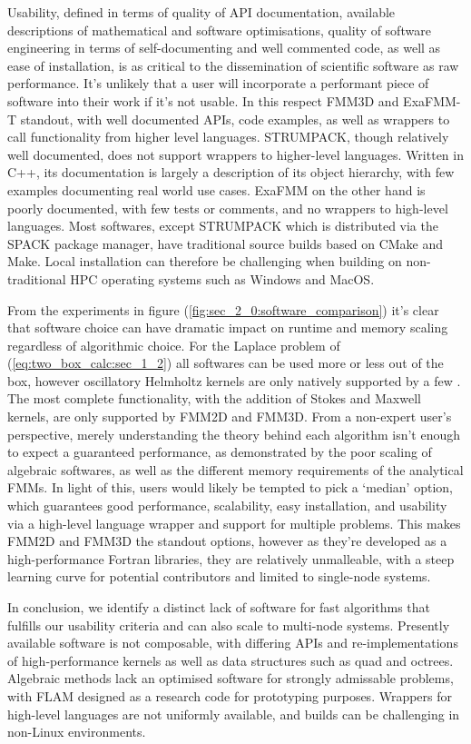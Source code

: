 Usability, defined in terms of quality of API documentation, available descriptions of mathematical and software optimisations,  quality of software engineering in terms of self-documenting and well commented code, as well as ease of installation, is as critical to the dissemination of scientific software as raw performance. It's unlikely that a user will incorporate a performant piece of software into their work if it's not usable. In this respect FMM3D and ExaFMM-T standout, with well documented APIs, code examples, as well as wrappers to call functionality from higher level languages. STRUMPACK, though relatively well documented, does not support wrappers to higher-level languages. Written in C++, its documentation is largely a description of its object hierarchy, with few examples documenting real world use cases. ExaFMM on the other hand is poorly documented, with few tests or comments, and no wrappers to high-level languages. Most softwares, except STRUMPACK which is distributed via the SPACK package manager, have traditional source builds based on CMake and Make. Local installation can therefore be challenging when building on non-traditional HPC operating systems such as Windows and MacOS.

From the experiments in figure (\ref{fig:sec_2_0:software_comparison}) it's clear that software choice can have dramatic impact on runtime and memory scaling regardless of algorithmic choice. For the Laplace problem of (\ref{eq:two_box_calc:sec_1_2}) all softwares can be used more or less out of the box, however oscillatory Helmholtz kernels are only natively supported by a few \cite{exafmm,wang2021exafmm,fmm2d, fmm3d}. The most complete functionality, with the addition of Stokes and Maxwell kernels, are only supported by FMM2D and FMM3D. From a non-expert user's perspective, merely understanding the theory behind each algorithm isn't enough to expect a guaranteed performance, as demonstrated by the poor scaling of algebraic softwares, as well as the different memory requirements of the analytical FMMs. In light of this, users would likely be tempted to pick a `median' option, which guarantees good performance, scalability, easy installation, and usability via a high-level language wrapper and support for multiple problems. This makes FMM2D and FMM3D the standout options, however as they're developed as a high-performance Fortran libraries, they are relatively unmalleable, with a steep learning curve for potential contributors and limited to single-node systems.

In conclusion, we identify a distinct lack of software for fast algorithms that fulfills our usability criteria and can also scale to multi-node systems. Presently available software is not composable, with differing APIs and re-implementations of high-performance kernels as well as data structures such as quad and octrees. Algebraic methods lack an optimised software for strongly admissable problems, with FLAM designed as a research code for prototyping purposes. Wrappers for high-level languages are not uniformly available, and builds can be challenging in non-Linux environments.


